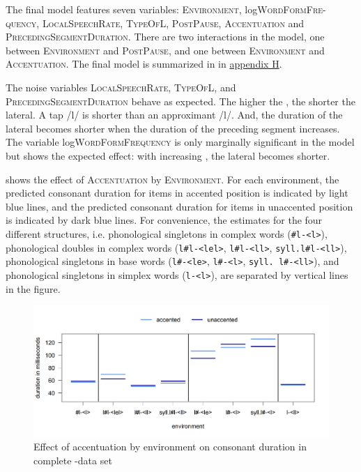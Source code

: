 The final model features seven variables: \textsc{Environment}, log\textsc{WordFormFre-quency},  \textsc{LocalSpeechRate}, \textsc{TypeOfL}, \textsc{PostPause}, \textsc{Accentuation} and \textsc{PrecedingSegmentDuration}. 
There are two interactions in the model, one between \textsc{Environment} and \textsc{PostPause}, and one between \textsc{Environment} and \textsc{Accentuation}. The final model is summarized in  in \hyperref[Appendix H: Model Summaries Experiment]{appendix H}.


The noise variables \textsc{LocalSpeechRate}, \textsc{TypeOfL}, and \textsc{PrecedingSegmentDuration} behave as expected. The higher the , the shorter the lateral. A tap /l/ is shorter than an approximant /l/. And, the duration of the lateral becomes shorter when the duration of the preceding segment increases.
The variable log\textsc{WordFormFrequency} is only marginally significant in the model but shows the expected effect: with increasing , the lateral becomes shorter. 


 shows the effect of \textsc{Accentuation} by \textsc{Environment}. For each environment, the predicted consonant duration for items in accented position is indicated by light blue lines, and the predicted consonant duration for  items in unaccented position is indicated by dark blue lines.
 For convenience, the estimates for the four different structures, i.e. phonological singletons in complex words (\texttt{\#l-<l>}), phonological doubles in complex words  (\texttt{l\#l-<lel>}, \texttt{l\#l-<ll>}, \texttt{syll.l\#l-<ll>}), phonological singletons in base words (\texttt{l\#-<le>}, \texttt{l\#-<l>}, \texttt{syll. l\#-<ll>}), and phonological singletons in simplex words (\texttt{l-<l>}), are separated by vertical lines in the figure. 


\begin{figure}
	

	\includegraphics [scale=0.48] {images/Experiment/LyModelCompleteInterEnvAccLines}

	\caption{Effect of accentuation by environment on consonant duration in complete -data set}
	\label{fig:Env Acc ly Complete experiment}

\end{figure}




